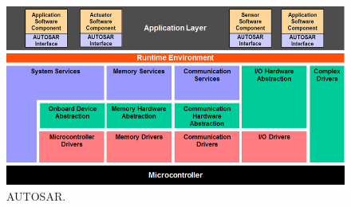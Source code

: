 \begin{figure}[H]
\centering
\includegraphics[width=\textwidth]{./img/literature_autosar.png}
\caption{AUTOSAR.~\cite{website:autosar}}\label{fig:autosar}
\end{figure}

